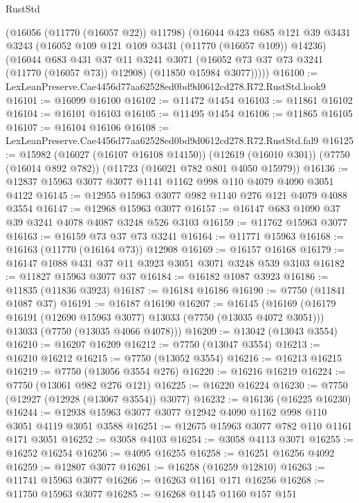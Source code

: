 \begin{lexlean}{RustStd}
\begin{coremodule}
        (@16056 (@11770 (@16057 @22)) @11798)
        (@16044
          @423
          @685
          @121
          @39
          @3431
          @3243
          (@16052 @109 @121 @109 @3431 (@11770 (@16057 @109)) @14236)
          (@16044
            @683
            @431
            @37
            @11
            @3241
            @3071
            (@16052 @73 @37 @73 @3241 (@11770 (@16057 @73)) @12908)
            (@11850 @15984 @3077)))))
@16100 := LexLeanPreserve.Cae4456d77aa62528ed0bd9d0612cd278.R72.RustStd.look9
@16101 := @16099 @16100
@16102 := @11472 @1454
@16103 := @11861 @16102
@16104 := @16101 @16103
@16105 := @11495 @1454
@16106 := @11865 @16105
@16107 := @16104 @16106
@16108 := LexLeanPreserve.Cae4456d77aa62528ed0bd9d0612cd278.R72.RustStd.fal9
@16125 := @15982
    (@16027 (@16107 @16108 @14150))
    (@12619 (@16010 @301))
    (@7750 (@16014 @892 @782))
    (@11723 (@16021 @782 @801 @4050 @15979))
@16136 := @12837 @15963 @3077 @3077 @1141 @1162 @998 @110 @4079 @4090 @3051 @4122
@16145 := @12955 @15963 @3077 @982 @1140 @276 @121 @4079 @4088 @3554
@16147 := @12968 @15963 @3077
@16157 := @16147 @683 @1090 @37 @39 @3241 @4078 @4087 @3248 @526 @3103
@16159 := @11762 @15963 @3077
@16163 := @16159 @73 @37 @73 @3241
@16164 := @11771 @15963
@16168 := @16163 (@11770 (@16164 @73)) @12908
@16169 := @16157 @16168
@16179 := @16147 @1088 @431 @37 @11 @3923 @3051 @3071 @3248 @539 @3103
@16182 := @11827 @15963 @3077 @37
@16184 := @16182 @1087 @3923
@16186 := @11835 (@11836 @3923)
@16187 := @16184 @16186
@16190 := @7750 (@11841 @1087 @37)
@16191 := @16187 @16190
@16207 := @16145
    (@16169
      (@16179 @16191 (@12690 @15963 @3077) @13033 (@7750 (@13035 @4072 @3051)))
      @13033
      (@7750 (@13035 @4066 @4078)))
@16209 := @13042 (@13043 @3554)
@16210 := @16207 @16209
@16212 := @7750 (@13047 @3554)
@16213 := @16210 @16212
@16215 := @7750 (@13052 @3554)
@16216 := @16213 @16215
@16219 := @7750 (@13056 @3554 @276)
@16220 := @16216 @16219
@16224 := @7750 (@13061 @982 @276 @121)
@16225 := @16220 @16224
@16230 := @7750 (@12927 (@12928 (@13067 @3554)) @3077)
@16232 := @16136 (@16225 @16230)
@16244 := @12938 @15963 @3077 @3077 @12942 @4090 @1162 @998 @110 @3051 @4119 @3051 @3588
@16251 := @12675 @15963 @3077 @782 @110 @1161 @171 @3051
@16252 := @3058 @4103
@16254 := @3058 @4113 @3071
@16255 := @16252 @16254
@16256 := @4095 @16255
@16258 := @16251 @16256 @4092
@16259 := @12807 @3077
@16261 := @16258 (@16259 @12810)
@16263 := @11741 @15963 @3077
@16266 := @16263 @1161 @171 @16256
@16268 := @11750 @15963 @3077
@16285 := @16268
    @1145
    @1160
    @157
    @151

\end{coremodule}
\end{lexlean}
